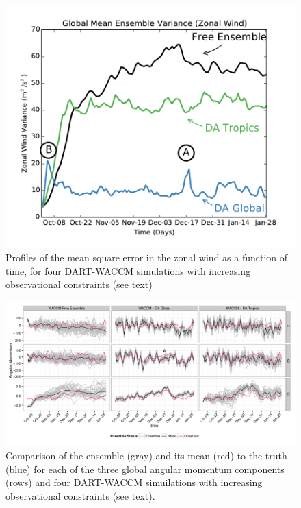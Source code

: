  \begin{figure}
	 \includegraphics[width=\textwidth]{Paper_figures/ERPDA_paper_evalvariable_state_space.pdf}
	 \caption{Profiles of the mean square error in the zonal wind as a function of time, for four DART-WACCM simulations with increasing observational constraints (see text)}
	 \label{fig:evalvariable_state}
\end{figure}



\begin{figure}
	 \includegraphics[width=\textwidth]{Paper_figures/ERPDA_paper_evalvariable_aam_space.pdf}
	 \caption{Comparison of the ensemble (gray) and its mean (red) to the truth (blue) for each of the three global angular momentum components (rows) and four DART-WACCM simuilations with increasing observational constraints (see text).}
	 \label{fig:evalvariable_aam}
\end{figure}





